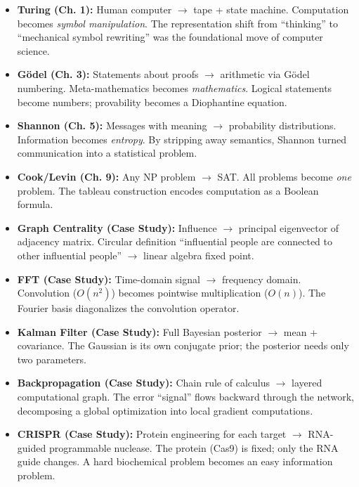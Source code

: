 \begin{itemize}
\item \textbf{Turing (Ch. 1):} Human computer $\to$ tape + state machine. Computation becomes \emph{symbol manipulation}. The representation shift from ``thinking'' to ``mechanical symbol rewriting'' was the foundational move of computer science.

\item \textbf{G\"odel (Ch. 3):} Statements about proofs $\to$ arithmetic via G\"odel numbering. Meta-mathematics becomes \emph{mathematics}. Logical statements become numbers; provability becomes a Diophantine equation.

\item \textbf{Shannon (Ch. 5):} Messages with meaning $\to$ probability distributions. Information becomes \emph{entropy}. By stripping away semantics, Shannon turned communication into a statistical problem.

\item \textbf{Cook/Levin (Ch. 9):} Any NP problem $\to$ SAT. All problems become \emph{one} problem. The tableau construction encodes computation as a Boolean formula.

\item \textbf{Graph Centrality (Case Study):} Influence $\to$ principal eigenvector of adjacency matrix. Circular definition ``influential people are connected to other influential people'' $\to$ linear algebra fixed point.

\item \textbf{FFT (Case Study):} Time-domain signal $\to$ frequency domain. Convolution ($O(n^2)$) becomes pointwise multiplication ($O(n)$). The Fourier basis diagonalizes the convolution operator.

\item \textbf{Kalman Filter (Case Study):} Full Bayesian posterior $\to$ mean + covariance. The Gaussian is its own conjugate prior; the posterior needs only two parameters.

\item \textbf{Backpropagation (Case Study):} Chain rule of calculus $\to$ layered computational graph. The error ``signal'' flows backward through the network, decomposing a global optimization into local gradient computations.

\item \textbf{CRISPR (Case Study):} Protein engineering for each target $\to$ RNA-guided programmable nuclease. The protein (Cas9) is fixed; only the RNA guide changes. A hard biochemical problem becomes an easy information problem.


\end{itemize}
